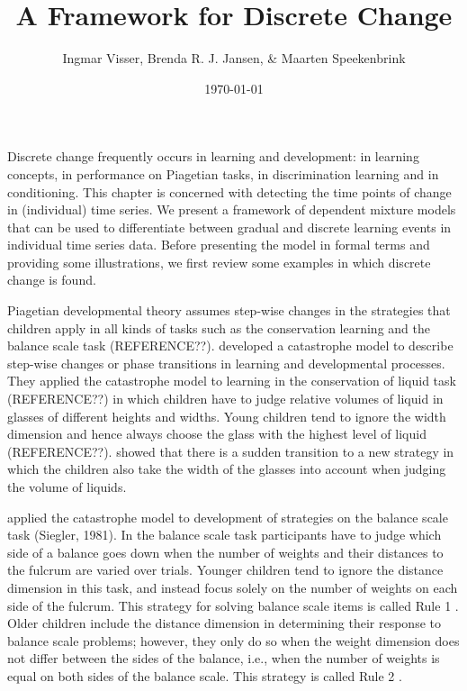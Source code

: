 \documentclass[a4paper,12pt,man,english]{apa} %
\title{A Framework for Discrete Change}
\author{Ingmar Visser, Brenda R. J. Jansen, \& Maarten Speekenbrink}
\date{\today}
\affiliation{Department of Psychology, University of Amsterdam\\
 Correspondence concerning this article should be addressed to:
 \\
 Ingmar Visser \\
 Department of Psychology, University of Amsterdam \\
 Roetersstraat 15 \\
 1018 WB Amsterdam \\
 phone: +31 (20) 5256723 \\
 fax: +31 (20) 6390279 \\
 email: i.visser@uva.nl}
\newcommand{\citet}{\citeA}
\begin{document}
\maketitle

Discrete change frequently occurs in learning and development: in
learning concepts, in performance on Piagetian tasks, in
discrimination learning and in conditioning.  This chapter is
concerned with detecting the time points of change in (individual)
time series.  We present a framework of dependent mixture models that can
be used to differentiate between gradual and discrete learning events
in individual time series data.  Before presenting the model in formal
terms and providing some illustrations, we first review some examples
in which discrete change is found.

Piagetian developmental theory assumes step-wise changes in the
strategies that children apply in all kinds of tasks such as the
conservation learning and the balance scale task (REFERENCE??).
\citet{Maas1992} developed a catastrophe model to describe step-wise
changes or phase transitions in learning and developmental processes.
They applied the catastrophe model to learning in the conservation of
liquid task (REFERENCE??)  in which children have to judge relative
volumes of liquid in glasses of different heights and widths.  Young
children tend to ignore the width dimension and hence always choose
the glass with the highest level of liquid (REFERENCE??).
\citet{Maas1992} showed that there is a sudden transition to a new
strategy in which the children also take the width of the glasses into
account when judging the volume of liquids.

\citet{Jansen2001} applied the catastrophe model to
development of strategies on the balance scale task (Siegler, 1981).
In the balance scale task participants have to judge which side of a
balance goes down when the number of weights and their distances to
the fulcrum are varied over trials.  Younger children tend to ignore
the distance dimension in this task, and instead focus solely on the
number of weights on each side of the fulcrum.  This strategy for
solving balance scale items is called Rule 1 \cite{Siegler1981}.  Older
children include the distance dimension in determining their response
to balance scale problems; however, they only do so when the weight
dimension does not differ between the sides of the balance, i.e., when
the number of weights is equal on both sides of the balance scale.
This strategy is called Rule 2 \cite{Siegler1981}.
\end{document}

